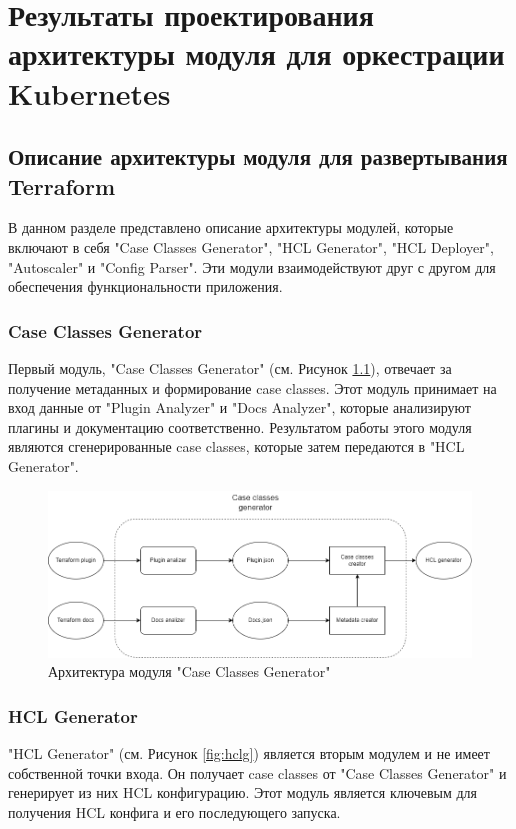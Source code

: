 \chapter{Результаты проектирования архитектуры модуля для оркестрации
Kubernetes}


\section{Описание архитектуры модуля для развертывания Terraform}

В данном разделе представлено описание архитектуры модулей, которые включают в
себя "Case Classes Generator", "HCL Generator", "HCL Deployer", "Autoscaler" и
"Config Parser". Эти модули взаимодействуют друг с другом для обеспечения
функциональности приложения.

\subsection{Case Classes Generator}

Первый модуль, "Case Classes Generator" (см. Рисунок \ref{fig:ccg}), отвечает за
получение метаданных и формирование case classes. Этот модуль принимает на вход
данные от "Plugin Analyzer" и "Docs Analyzer", которые анализируют плагины и
документацию соответственно. Результатом работы этого модуля являются
сгенерированные case classes, которые затем передаются в "HCL Generator".

\begin{figure}[h]
  \centering
  \includegraphics[scale=0.5]{img/1.png}
  \caption{Архитектура модуля "Case Classes Generator"}
  \label{fig:ccg}
\end{figure}

\subsection{HCL Generator}

"HCL Generator" (см. Рисунок \ref{fig:hclg}) является вторым модулем и не имеет
собственной точки входа. Он получает case classes от "Case Classes Generator" и
генерирует из них HCL конфигурацию. Этот модуль является ключевым для получения
HCL конфига и его последующего запуска.


